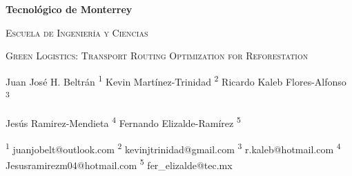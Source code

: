 \documentclass{amsart}
\begin{document}
    \begin{center}
        {\bfseries\LARGE Tecnol\'ogico de Monterrey\par}
        {\scshape\Large Escuela de Ingenier\'ia y Ciencias\par}
        \vspace{0.5cm}
        {\scshape\Huge Green Logistics: Transport Routing Optimization for Reforestation\par}
        \vspace{0.5cm}
    
        {\small Juan Jos\'e H. Beltr\'an \textsuperscript{1} \hspace{5pt} Kevin Mart\'inez-Trinidad \textsuperscript{2} \hspace{5pt} Ricardo Kaleb Flores-Alfonso \textsuperscript{3} \par Jes\'us Ramirez-Mendieta \textsuperscript{4} \hspace{5pt} Fernando Elizalde-Ram\'irez \textsuperscript{5}\par}
        
        \vspace{0.5cm}
        
        {\tiny \textsuperscript{1} juanjobelt@outlook.com \hspace{3pt} \textsuperscript{2} kevinjtrinidad@gmail.com \hspace{3pt}  \textsuperscript{3} r.kaleb@hotmail.com \hspace{3pt} \textsuperscript{4} Jesusramirezm04@hotmail.com \hspace{3pt} \textsuperscript{5} fer\_elizalde@tec.mx \par}
        
        
        

\end{center}
\end{document}
